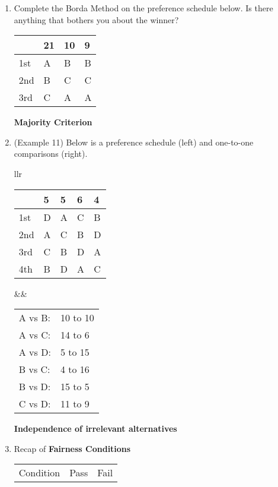 \documentclass[12pt]{article}
\renewcommand{\emph}[1]{\textsf{\textbf{#1}}}
\begin{document}
\begin{enumerate}
\item Complete the Borda Method on the preference schedule below. Is there anything that bothers you about the winner?

\begin{tabular}{l || lll}
& 21&10&9\\
\hline
1st&A&B&B\\
2nd&B&C&C\\
3rd&C&A&A\\
\end{tabular}

\vfill

 \emph{Majority Criterion}

\vspace{1in}
	
\item  (Example 11) Below is a preference schedule (left) and one-to-one comparisons (right).\\

\begin{tabular}{llr}
\begin{tabular}{l || llll}
&5&5&6&4\\
\hline
1st&D&A&C&B\\
2nd&A&C&B&D\\
3rd&C&B&D&A\\
4th&B&D&A&C\\
\end{tabular}
&\quad&
\begin{tabular}{ll}
A vs B: & 10 to 10 \\
A vs C: & 14 to 6\\
A vs D:  & 5 to 15\\
B vs C: & 4 to 16\\
B vs D: &15 to 5 \\
C vs D: & 11 to 9 \\
\end{tabular}
\end{tabular}
\vfill

\emph{Independence of irrelevant alternatives}

\vspace{1in}

\newpage

\item Recap of \emph{Fairness Conditions}

\begin{tabular}{p{} p{} p{}}
Condition & Pass & Fail
\end{tabular}



\end{enumerate}
\end{document}
